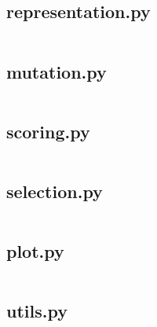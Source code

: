 \documentclass[11pt,a4paper]{article}
\begin{document}
\begin{appendices}
\subsection{representation.py}
\inputminted{python}{../code/representation.py}\newpage
\subsection{mutation.py}
\inputminted{python}{../code/mutation.py}\newpage
\subsection{scoring.py}
\inputminted{python}{../code/scoring.py}\newpage
\subsection{selection.py}
\inputminted{python}{../code/selection.py}\newpage
\subsection{plot.py}
\inputminted{python}{../code/plot.py}\newpage
\subsection{utils.py}
\inputminted{python}{../code/utils.py}\newpage


\end{appendices}
\end{document}
